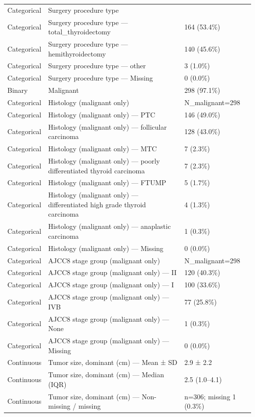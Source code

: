 \begin{table}[htbp]
\begin{tabular}{lll}
Categorical & Surgery procedure type &  \\
Categorical & Surgery procedure type — total\_thyroidectomy & 164 (53.4\%) \\
Categorical & Surgery procedure type — hemithyroidectomy & 140 (45.6\%) \\
Categorical & Surgery procedure type — other & 3 (1.0\%) \\
Categorical & Surgery procedure type — Missing & 0 (0.0\%) \\
Binary & Malignant & 298 (97.1\%) \\
Categorical & Histology (malignant only) & N\_malignant=298 \\
Categorical & Histology (malignant only) — PTC & 146 (49.0\%) \\
Categorical & Histology (malignant only) — follicular carcinoma & 128 (43.0\%) \\
Categorical & Histology (malignant only) — MTC & 7 (2.3\%) \\
Categorical & Histology (malignant only) — poorly differentiated thyroid carcinoma & 7 (2.3\%) \\
Categorical & Histology (malignant only) — FTUMP & 5 (1.7\%) \\
Categorical & Histology (malignant only) — differentiated high grade thyroid carcinoma & 4 (1.3\%) \\
Categorical & Histology (malignant only) — anaplastic carcinoma & 1 (0.3\%) \\
Categorical & Histology (malignant only) — Missing & 0 (0.0\%) \\
Categorical & AJCC8 stage group (malignant only) & N\_malignant=298 \\
Categorical & AJCC8 stage group (malignant only) — II & 120 (40.3\%) \\
Categorical & AJCC8 stage group (malignant only) — I & 100 (33.6\%) \\
Categorical & AJCC8 stage group (malignant only) — IVB & 77 (25.8\%) \\
Categorical & AJCC8 stage group (malignant only) — None & 1 (0.3\%) \\
Categorical & AJCC8 stage group (malignant only) — Missing & 0 (0.0\%) \\
Continuous & Tumor size, dominant (cm) — Mean ± SD & 2.9 ± 2.2 \\
Continuous & Tumor size, dominant (cm) — Median (IQR) & 2.5 (1.0–4.1) \\
Continuous & Tumor size, dominant (cm) — Non-missing / missing & n=306; missing 1 (0.3\%) \\

\end{tabular}
\end{table}
